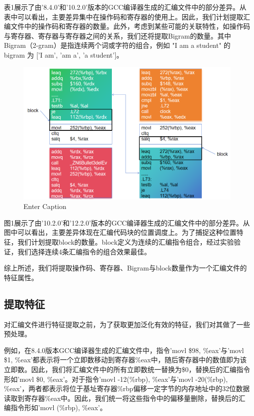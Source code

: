 表1展示了由'8.4.0'和'10.2.0'版本的GCC编译器生成的汇编文件中的部分差异。从表中可以看出，主要差异集中在操作码和寄存器的使用上。因此，我们计划提取汇编文件中的操作码和寄存器的数量。此外，考虑到某些可能的关联特性，如操作码与寄存器、寄存器与寄存器之间的关系，我们还将提取Bigram的数量。其中Bigram（2-gram）是指连续两个词或字符的组合，例如 "I am a student" 的 bigram 为 ['I am', 'am a', 'a student']。
\begin{figure}
    \centering
    \includegraphics[width=1\linewidth]{block.png}
    \caption{Enter Caption}
    \label{fig:enter-label}
\end{figure}


  图1展示了由'10.2.0'和'12.2.0'版本的GCC编译器生成的汇编文件中的部分差异。从图中可以看出，主要差异体现在汇编代码块的位置调度上。为了捕捉这种位置特征，我们计划提取block的数量。block定义为连续的汇编指令组合，经过实验验证，我们选择连续4条汇编指令的组合效果最佳。

  综上所述，我们将提取操作码、寄存器、Bigram与block数量作为一个汇编文件的特征属性。

  \subsection{提取特征}
  对汇编文件进行特征提取之前，为了获取更加泛化有效的特征，我们对其做了一些预处理。
  
  例如，在8.4.0版本GCC编译器生成的汇编文件中，指令'movl \$98, \%eax'与'movl \$1, \%eax'都表示将一个立即数移动到寄存器\%eax中，随后寄存器中的数值即为该立即数。因此，我们将汇编文件中的所有立即数统一替换为\$0，替换后的汇编指令形如'movl \$0, \%eax'。对于指令'movl -12(\%rbp), \%eax'与'movl -20(\%rbp), \%eax'，两者都表示将位于基址寄存器\%rbp偏移一定字节的内存地址中的32位数据读取到寄存器\%eax中。因此，我们统一将这些指令中的偏移量删除，替换后的汇编指令形如'movl (\%rbp), \%eax'。

